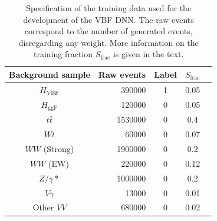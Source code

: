 \begin{table}[h]
    \centering
    \small
    \begin{tabular}{ c  | r c c c}
        \toprule
        Background sample  & Raw events & Label & $S_\text{frac}$ \\
        \midrule
        $H_{\mathrm{VBF}}$ & 390000     & 1     & 0.05            \\
        $H_{\mathrm{ggF}}$ & 120000     & 0     & 0.05            \\
        $t\bar{t}$         & 1530000    & 0     & 0.4             \\
        $Wt$               & 60000      & 0     & 0.07            \\
        $WW$ (Strong)      & 1900000    & 0     & 0.2             \\
        $WW$ (EW)          & 220000     & 0     & 0.12            \\
        $Z/\gamma*$        & 1000000     & 0     & 0.2             \\
        $V\gamma$          & 13000       & 0     & 0.01            \\
        Other $VV$         & 680000     & 0     & 0.02            \\
        \bottomrule
    \end{tabular}
    \caption{Specification of the training data used for the development of the VBF DNN. The raw events correspond to the number of generated events, disregarding any weight. More information on the training fraction $S_\text{frac}$ is given in the text.}
    \label{tab:DNNtrainingstats}
\end{table}

